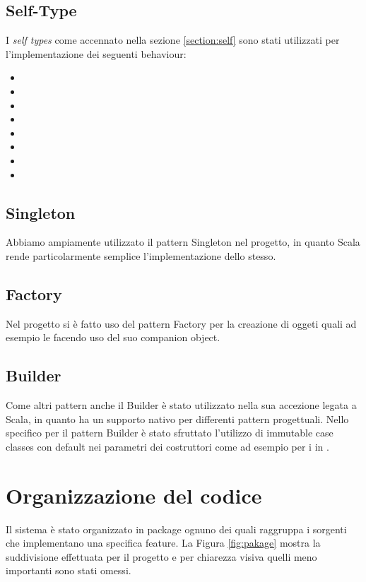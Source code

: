 \subsection{Self-Type}
I \textit{self types} come accennato nella sezione \ref{section:self} sono stati utilizzati per l'implementazione dei seguenti behaviour:
\begin{itemize}
    \item {}
    \item {}
    \item {}
    \item {}
    \item {}
    \item {}
    \item {}
    \item {}
\end{itemize}
\subsection{Singleton}
Abbiamo ampiamente utilizzato il pattern Singleton nel progetto, in quanto Scala rende particolarmente semplice l’implementazione dello stesso.
\subsection{Factory}
Nel progetto si è fatto uso del pattern Factory per la creazione di oggeti quali ad esempio le  facendo uso del suo companion object.
\subsection{Builder}
Come altri pattern anche il Builder è stato utilizzato nella sua accezione legata a Scala, in quanto ha un supporto nativo per differenti pattern progettuali. Nello specifico per il pattern Builder è stato sfruttato l’utilizzo di immutable case classes con default nei parametri dei costruttori come ad esempio per i  in .

\section{Organizzazione del codice}
Il sistema è stato organizzato in package ognuno dei quali raggruppa i sorgenti che implementano una specifica feature. La Figura \ref{fig:pakage} mostra la suddivisione effettuata per il progetto e per chiarezza visiva quelli meno importanti sono stati omessi.

